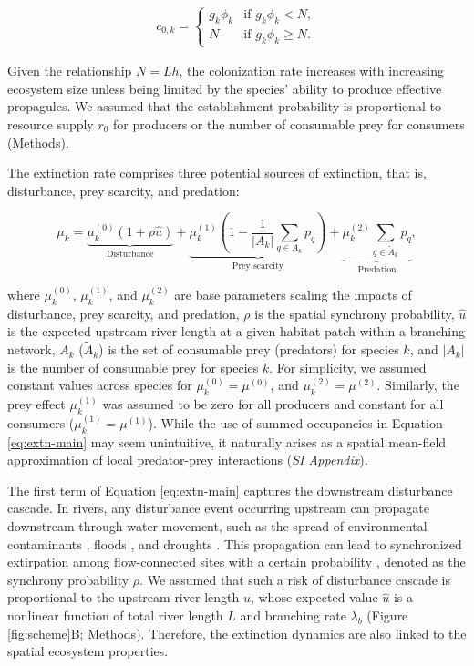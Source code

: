 \documentclass[11pt, class=article, crop=false]{standalone}
\begin{document}
\begin{align}
    c_{0, k} = 
    \begin{cases}
        g_k \phi_k & \text{if $g_k \phi_k < N$},\\
        N & \text{if $g_k \phi_k \ge N$}.
    \end{cases}
    \label{eq:c0-prod-main}
\end{align}

Given the relationship $N = Lh$, the colonization rate increases with increasing ecosystem size unless being limited by the species' ability to produce effective propagules.
We assumed that the establishment probability is proportional to resource supply $r_0$ for producers or the number of consumable prey for consumers (Methods).

The extinction rate comprises three potential sources of extinction, that is, disturbance, prey scarcity, and predation:

\begin{equation}
    \mu_{k} = 
        \underbrace{\mu_{k}^{(0)} (1 + \rho \hat{u})}_{\text{Disturbance}} + 
        \underbrace{\mu_{k}^{(1)} \left(1 - \frac{1}{|A_{k}|}\sum_{q\in A_{k}} p_{q} \right)}_{\text{Prey scarcity}} + 
        \underbrace{\mu_{k}^{(2)} \sum_{q \in \tilde{A}_{k}} p_{q}}_{\text{Predation}},
    \label{eq:extn-main}    
\end{equation}

where $\mu_k^{(0)}$, $\mu_k^{(1)}$, and $\mu_k^{(2)}$ are base parameters scaling the impacts of disturbance, prey scarcity, and predation, $\rho$ is the spatial synchrony probability, $\hat{u}$ is the expected upstream river length at a given habitat patch within a branching network, $A_{k}$ ($\tilde{A}_{k}$) is the set of consumable prey (predators) for species $k$, and $|A_{k}|$ is the number of consumable prey for species $k$.
For simplicity, we assumed constant values across species for $\mu_k^{(0)} = \mu^{(0)}$, and $\mu_k^{(2)} = \mu^{(2)}$.
Similarly, the prey effect $\mu_k^{(1)}$ was assumed to be zero for all producers and constant for all consumers ($\mu_k^{(1)} = \mu^{(1)}$).
While the use of summed occupancies in Equation \ref{eq:extn-main} may seem unintuitive, it naturally arises as a spatial mean-field approximation of local predator-prey interactions (\textit{SI Appendix}).

The first term of Equation \ref{eq:extn-main} captures the downstream disturbance cascade.
In rivers, any disturbance event occurring upstream can propagate downstream through water movement, such as the spread of environmental contaminants \citep{massoudieh_biogeochemical_2010}, floods \citep{swanson_flood_1998, nakamura_disturbance_2000}, and droughts \citep{sarremejane_drought_2021}.
This propagation can lead to synchronized extirpation among flow-connected sites with a certain probability \citep{larsen_geography_2021, sarremejane_drought_2021}, denoted as the synchrony probability $\rho$. 
We assumed that such a risk of disturbance cascade is proportional to the upstream river length $u$, whose expected value $\hat{u}$ is a nonlinear function of total river length $L$ and branching rate $\lambda_b$ (Figure \ref{fig:scheme}B; Methods).
Therefore, the extinction dynamics are also linked to the spatial ecosystem properties.
\end{document}
